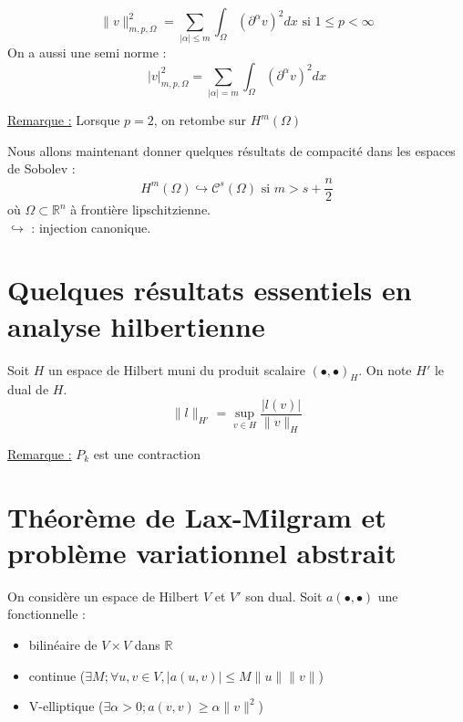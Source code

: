 \[\|v\|^2_{m,p,\Omega} = \sum_{|\alpha|\leq m} \int_\Omega (\partial^\alpha v)^2 dx \text{ si } 1\leq p < \infty\]
On a aussi une semi norme :
\[|v|^2_{m,p,\Omega} = \sum_{|\alpha|=m} \int_\Omega (\partial^\alpha v)^2 dx \]

\bigskip
\underline{Remarque :} Lorsque $p=2$, on retombe sur $H^m(\Omega)$


Nous allons maintenant donner quelques résultats de compacité dans les espaces de Sobolev :
\[H^m(\Omega) \hookrightarrow \mathcal{C}^s(\Omega) \text{ si } m> s+\frac{n}{2}\]
où $\Omega\subset \mathbb{R}^n$ à frontière lipschitzienne.\\
$\hookrightarrow$ : injection canonique.

\section{Quelques résultats essentiels en analyse hilbertienne}
Soit $H$ un espace de Hilbert muni du produit scalaire $(\bullet, \bullet)_H$. On note $H'$ le dual de $H$.
	\[\|l\|_{H'} = \sup_{v\in H} \frac{|l(v)|}{\|v\|_H}\]


\underline{Remarque :} $P_k$ est une contraction


\section{Théorème de Lax-Milgram et problème variationnel abstrait}
On considère un espace de Hilbert $V$ et $V'$ son dual. Soit $a(\bullet,\bullet)$ une fonctionnelle :
\begin{itemize}
	\item bilinéaire de $V\times V$ dans $\mathbb{R}$
	\item continue ($\exists M; \forall u,v\in V, |a(u,v)|\leq M\|u\|\|v\|$)
	\item V-elliptique ($\exists \alpha>0; a(v,v)\geq \alpha\|v\|^2$)
\end{itemize}

